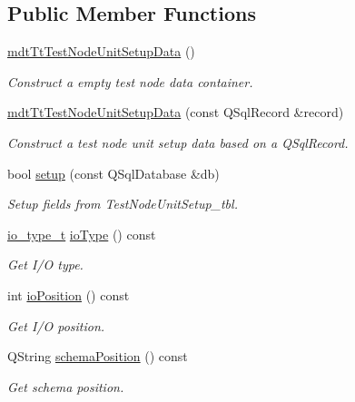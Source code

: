 \subsection*{Public Member Functions}
\begin{DoxyCompactItemize}
\item 
\hyperlink{classmdt_tt_test_node_unit_setup_data_a0d9372606909ab76e423f8aa180a9c38}{mdt\-Tt\-Test\-Node\-Unit\-Setup\-Data} ()
\begin{DoxyCompactList}\small\item\em Construct a empty test node data container. \end{DoxyCompactList}\item 
\hyperlink{classmdt_tt_test_node_unit_setup_data_aee5b9ec83805c0ef6fecae14adcee518}{mdt\-Tt\-Test\-Node\-Unit\-Setup\-Data} (const Q\-Sql\-Record \&record)
\begin{DoxyCompactList}\small\item\em Construct a test node unit setup data based on a Q\-Sql\-Record. \end{DoxyCompactList}\item 
bool \hyperlink{classmdt_tt_test_node_unit_setup_data_a2a2bb93f0ceb79adec8b4692cf1afb39}{setup} (const Q\-Sql\-Database \&db)
\begin{DoxyCompactList}\small\item\em Setup fields from Test\-Node\-Unit\-Setup\-\_\-tbl. \end{DoxyCompactList}\item 
\hyperlink{classmdt_tt_test_node_unit_setup_data_a4e69dcc72bebc34d6db64cff91dbfc54}{io\-\_\-type\-\_\-t} \hyperlink{classmdt_tt_test_node_unit_setup_data_a9fd9a35361e52d466ef6e62d29383aa4}{io\-Type} () const 
\begin{DoxyCompactList}\small\item\em Get I/\-O type. \end{DoxyCompactList}\item 
int \hyperlink{classmdt_tt_test_node_unit_setup_data_a24b6ba073f10005678ada247d2b23791}{io\-Position} () const 
\begin{DoxyCompactList}\small\item\em Get I/\-O position. \end{DoxyCompactList}\item 
Q\-String \hyperlink{classmdt_tt_test_node_unit_setup_data_a6ef0406acc3ef7b0b2ee8f168d2a3c76}{schema\-Position} () const 
\begin{DoxyCompactList}\small\item\em Get schema position. \end{DoxyCompactList}\end{DoxyCompactItemize}
